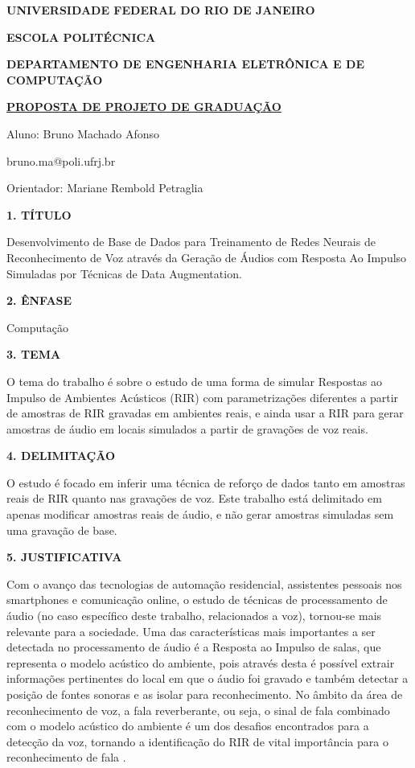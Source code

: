 \documentclass[a4paper,12pt,oneside,openany]{report}
\begin{document}
\begin{center}
\textbf{UNIVERSIDADE FEDERAL DO RIO DE JANEIRO}
\vspace{-0.2cm}

\textbf{ESCOLA POLITÉCNICA}
\vspace{-0.2cm}

\textbf{DEPARTAMENTO DE ENGENHARIA ELETRÔNICA E DE COMPUTAÇÃO}
\vspace{0.8cm}

\underline{\textbf{PROPOSTA DE PROJETO DE GRADUAÇÃO}}

Aluno: Bruno Machado Afonso
\vspace{-0.2cm}

bruno.ma@poli.ufrj.br

Orientador: Mariane Rembold Petraglia
\end{center}

\textbf{1. TÍTULO}

Desenvolvimento de Base de Dados para Treinamento de Redes Neurais de Reconhecimento de Voz através da Geração de Áudios com Resposta
Ao Impulso Simuladas por Técnicas de Data Augmentation.

\vspace{0.4cm}
\textbf{2. ÊNFASE}

Computação

\vspace{0.4cm}
\textbf{3. TEMA}

O tema do trabalho é sobre o estudo de uma forma de simular Respostas ao Impulso de Ambientes Acústicos (RIR) com parametrizações diferentes a partir de amostras 
de RIR gravadas em ambientes reais, e ainda usar a RIR para gerar amostras de áudio em locais simulados a partir de gravações de voz reais.

\vspace{0.4cm}
\textbf{4. DELIMITAÇÃO}

O estudo é focado em inferir uma técnica de reforço de dados tanto em amostras reais de RIR quanto nas gravações de voz. Este trabalho está delimitado em apenas 
modificar amostras reais de áudio, e não gerar amostras simuladas sem uma gravação de base.

\vspace{0.4cm}
\textbf{5. JUSTIFICATIVA}

Com o avanço das tecnologias de automação residencial, assistentes pessoais nos smartphones e comunicação online, o estudo de técnicas de
processamento de áudio (no caso específico deste trabalho, relacionados a voz), tornou-se mais relevante para a sociedade.
Uma das características mais importantes a ser detectada no processamento de áudio é a Resposta ao Impulso de salas, 
que representa o modelo acústico do ambiente, pois através desta é possível extrair informações pertinentes do local em que o áudio foi gravado
e também detectar a posição de fontes sonoras e as isolar para reconhecimento.
No âmbito da área de reconhecimento de voz, a fala reverberante, ou seja, o sinal de fala combinado com o modelo acústico do ambiente
é um dos desafios encontrados para a detecção da voz, tornando a identificação do RIR de vital importância para o reconhecimento de fala \cite{FAR-FIELD_ASR}.
\end{document}
